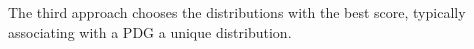 \documentclass{article}
\theoremstyle{plain}
\theoremstyle{definition}
\theoremstyle{remark}
\numberwithin{equation}{section}
\begin{document}
The third approach chooses the distributions with the best score, 
typically associating with a PDG a unique distribution.
\end{document}
